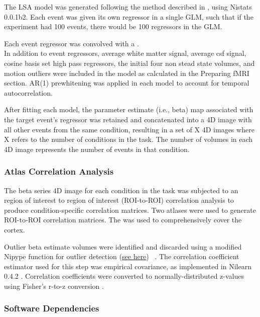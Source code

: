 \documentclass[10pt,letterpaper]{article}
\begin{document}
The LSA model was generated following the method described in
\cite[Rissman 2004]{Rissman2004}, using Nistats 0.0.1b2.
Each event was given its own regressor in a single GLM, such that
if the experiment had 100 events, there would be 100 regressors in the GLM.

Each event regressor was convolved with a \cite[glover hemodynamic response
function]{Glover1999}.\\
In addition to event regressors, average white matter signal, average csf signal,
cosine basis set high pass regressors, the initial four non stead state volumes, 
and motion outliers were included
in the model as calculated in the Preparing fMRI section.
AR(1) prewhitening was applied in each model to account
for temporal autocorrelation.

After fitting each model, the parameter estimate (i.e., beta) map
associated with the target event's regressor was retained and
concatenated into a 4D image with all other events from the same
condition, resulting in a set of X 4D images where X refers to the
number of conditions in the task.
The number of volumes in each 4D image represents the number of events in that condition.

\hypertarget{atlas-correlation-analysis}{%
\subsubsection{Atlas Correlation
Analysis}\label{atlas-correlation-analysis}}

The beta series 4D image for each condition in the task was subjected to
an region of interest to region of interest (ROI-to-ROI) correlation analysis
to produce condition-specific correlation matrices.
Two atlases were used to generate ROI-to-ROI correlation matrices.
The \cite[Schaefer Atlas (400 parcels, 17 networks)]{Schaefer2017} was
used to comprehensively cover the cortex.

Outlier beta estimate volumes were identified and discarded using a
modified Nipype function for outlier detection
(\href{https://github.com/HBClab/NiBetaSeries/blob/a45c0a1f/src/nibetaseries/interfaces/nilearn.py#L153}{see here}) ~\cite{Crosby1994}.
The correlation coefficient estimator used for this
step was empirical covariance, as implemented in Nilearn 0.4.2
\cite{Abraham2014}. Correlation coefficients were converted to
normally-distributed z-values using Fisher's r-to-z conversion
\cite{Fisher1915}.

\hypertarget{software-dependencies}{%
\subsubsection{Software Dependencies}\label{software-dependencies}}
\end{document}
